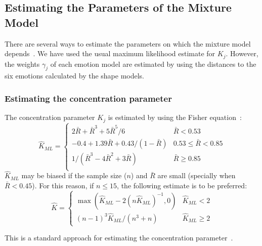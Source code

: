 \documentclass[10pt,journal,cspaper,compsoc]{IEEEtran}
\begin{document}
\subsection{Estimating the Parameters of the Mixture Model}
\label{sec_est_para}
There are several ways to estimate the parameters on which the mixture model depends~\cite{mardia1972statistics}. We have used the usual maximum likelihood estimate for $K_{j}$. However, the weights $\gamma_{j}$ of each emotion model are estimated by using the distances to the six emotions calculated by the shape models.

\subsubsection{Estimating the concentration parameter}
\label{sec_est_kappa}
The concentration parameter $K_{j}$ is estimated by using the Fisher equation~\cite{fisher1995statistical}:
\begin{equation}
\label{eq:kappa}
\hat{K}_{ML}=\left\{ \begin{array}{ll}
2\bar{R}+\bar{R}^{3}+5\bar{R}^{5}/6 	&	 \bar{R} < 0.53 \\ 
-0.4+1.39\bar{R}+0.43/(1-\bar{R}) 		&	 0.53 \leq \bar{R} < 0.85 \\ 
1/(\bar{R}^{3}-4\bar{R}^{2}+3\bar{R}) 	&	 \bar{R} \geq 0.85 \\ 
\end{array}\right.
\end{equation}
$\hat{K}_{ML}$ may be biased if the sample size ($n$) and $\bar{R}$ are small (specially when $\bar{R}<0.45$). For this reason, if $n \leq 15$, the following estimate is to be preferred:
\begin{equation}
\hat{K}=\left\{ \begin{array}{ll}
\max(\hat{K}_{ML}-2(n\hat{K}_{ML})^{-1},0) 	&	 \hat{K}_{ML} < 2 \\ 
(n-1)^{3}\hat{K}_{ML}/(n^{3}+n) 				&	 \hat{K}_{ML} \geq 2
\end{array}\right.
\end{equation}

\noindent This is a standard approach for estimating the concentration parameter~\cite{fisher1995statistical, mardia1972statistics}.
\end{document}
